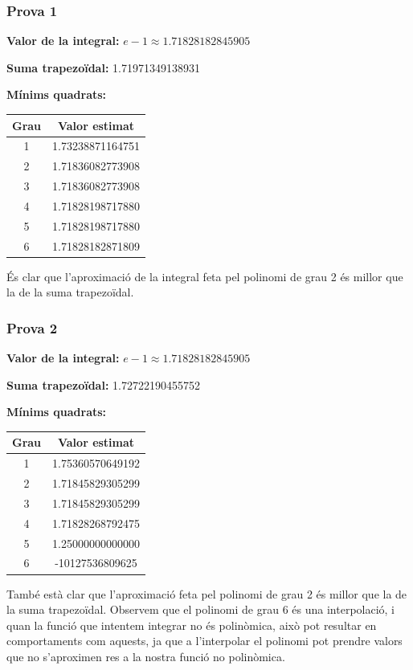 \documentclass[11pt,a4paper]{article}
\begin{document}
\subsubsection{Prova 1}

\textbf{Valor de la integral:} $e - 1 \approx 1.71828182845905$

\textbf{Suma trapezoïdal:} 1.71971349138931

\textbf{Mínims quadrats:}

\begin{tabular}{|c|c|}
\hline
\textbf{Grau} & \textbf{Valor estimat} \\
\hline
1 & 1.73238871164751 \\
\hline
2 & 1.71836082773908 \\
\hline
3 & 1.71836082773908 \\
\hline
4 & 1.71828198717880 \\
\hline
5 & 1.71828198717880 \\
\hline
6 & 1.71828182871809 \\
\hline
\end{tabular}

És clar que l'aproximació de la integral feta pel polinomi de grau 2 és millor que la de la suma trapezoïdal.

\subsubsection{Prova 2}

\textbf{Valor de la integral:} $e - 1 \approx 1.71828182845905$

\textbf{Suma trapezoïdal:} 1.72722190455752

\textbf{Mínims quadrats:}

\begin{tabular}{|c|c|}
\hline
\textbf{Grau} & \textbf{Valor estimat} \\
\hline
1 & 1.75360570649192 \\
\hline
2 & 1.71845829305299 \\
\hline
3 & 1.71845829305299 \\
\hline
4 & 1.71828268792475 \\
\hline
5 & 1.25000000000000 \\
\hline
6 & -10127536809625 \\
\hline
\end{tabular}

També està clar que l'aproximació feta pel polinomi de grau 2 és millor que la de la suma trapezoïdal. Observem que el polinomi de grau 6 és una interpolació, i quan la funció que intentem integrar no és polinòmica, això pot resultar en comportaments com aquests, ja que a l'interpolar el polinomi pot prendre valors que no s'aproximen res a la nostra funció no polinòmica.
\end{document}
